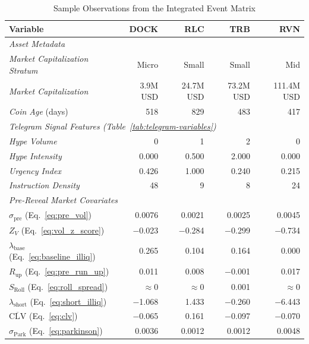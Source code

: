 \begin{table}[H]
\centering
\caption{Sample Observations from the Integrated Event Matrix}
\label{tab:sample-observations}
\small
\begin{tabular}{|l|r|r|r|r|}
\toprule
\textbf{Variable} & \textbf{DOCK} & \textbf{RLC} & \textbf{TRB} & \textbf{RVN} \\
\midrule
\multicolumn{5}{|l|}{\textit{Asset Metadata}} \\
\quad \textit{Market Capitalization Stratum} & Micro & Small & Small & Mid \\
\quad \textit{Market Capitalization} & 3.9M USD & 24.7M USD & 73.2M USD & 111.4M USD \\
\quad \textit{Coin Age} (days) & 518 & 829 & 483 & 417 \\
\midrule
\multicolumn{5}{|l|}{\textit{Telegram Signal Features (Table~\ref{tab:telegram-variables})}} \\
\quad \textit{Hype Volume} & 0 & 1 & 2 & 0 \\
\quad \textit{Hype Intensity} & 0.000 & 0.500 & 2.000 & 0.000 \\
\quad \textit{Urgency Index} & 0.426 & 1.000 & 0.240 & 0.215 \\
\quad \textit{Instruction Density} & 48 & 9 & 8 & 24 \\
\midrule
\multicolumn{5}{|l|}{\textit{Pre-Reveal Market Covariates}} \\
\quad $\sigma_{\text{pre}}$ {\footnotesize (Eq.~\eqref{eq:pre_vol})} & 0.0076 & 0.0021 & 0.0025 & 0.0045 \\
\quad $Z_V$ {\footnotesize (Eq.~\eqref{eq:vol_z_score})} & $-$0.023 & $-$0.284 & $-$0.299 & $-$0.734 \\
\quad $\lambda_{\text{base}}$ {\footnotesize (Eq.~\eqref{eq:baseline_illiq})} & 0.265 & 0.104 & 0.164 & 0.000 \\
\quad $R_{\text{up}}$ {\footnotesize (Eq.~\eqref{eq:pre_run_up})} & 0.011 & 0.008 & $-$0.001 & 0.017 \\
\quad $S_{\text{Roll}}$ {\footnotesize (Eq.~\eqref{eq:roll_spread})} & $\approx$0 & $\approx$0 & 0.001 & $\approx$0 \\
\quad $\lambda_{\text{short}}$ {\footnotesize (Eq.~\eqref{eq:short_illiq})} & $-$1.068 & 1.433 & $-$0.260 & $-$6.443 \\
\quad $\overline{\text{CLV}}$ {\footnotesize (Eq.~\eqref{eq:clv})} & $-$0.065 & 0.161 & $-$0.097 & $-$0.070 \\
\quad $\sigma_{\text{Park}}$ {\footnotesize (Eq.~\eqref{eq:parkinson})} & 0.0036 & 0.0012 & 0.0012 & 0.0048 \\

\end{tabular}
\end{table}
